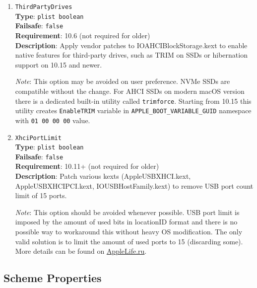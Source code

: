 \documentclass[]{article}
\begin{document}
\begin{enumerate}
  \emph{Note 3}: Trim operations are \emph{only} affected at booting phase when the startup volume is mounted.
  Either specifying timeout, or completely disabling trim with \texttt{0}, will not affect normal macOS running.

\item
  \texttt{ThirdPartyDrives}\\
  \textbf{Type}: \texttt{plist\ boolean}\\
  \textbf{Failsafe}: \texttt{false}\\
  \textbf{Requirement}: 10.6 (not required for older)\\
  \textbf{Description}: Apply vendor patches to IOAHCIBlockStorage.kext to enable
  native features for third-party drives, such as TRIM on SSDs or hibernation
  support on 10.15 and newer.

  \emph{Note}: This option may be avoided on user preference. NVMe SSDs are
  compatible without the change. For AHCI SSDs on modern macOS version there
  is a dedicated built-in utility called \texttt{trimforce}. Starting from 10.15
  this utility creates \texttt{EnableTRIM} variable in \texttt{APPLE\_BOOT\_VARIABLE\_GUID}
  namespace with \texttt{01 00 00 00} value.

\item
  \texttt{XhciPortLimit}\\
  \textbf{Type}: \texttt{plist\ boolean}\\
  \textbf{Failsafe}: \texttt{false}\\
  \textbf{Requirement}: 10.11+ (not required for older)\\
  \textbf{Description}: Patch various kexts (AppleUSBXHCI.kext, AppleUSBXHCIPCI.kext,
  IOUSBHostFamily.kext) to remove USB port count limit of 15 ports.

  \emph{Note}: This option should be avoided whenever possible. USB port limit
  is imposed by the amount of used bits in locationID format and there is no
  possible way to workaround this without heavy OS modification. The only
  valid solution is to limit the amount of used ports to 15 (discarding some).
  More details can be found on \href{https://applelife.ru/posts/550233}{AppleLife.ru}.

\end{enumerate}

\subsection{Scheme Properties}\label{kernelpropsscheme}
\end{document}
